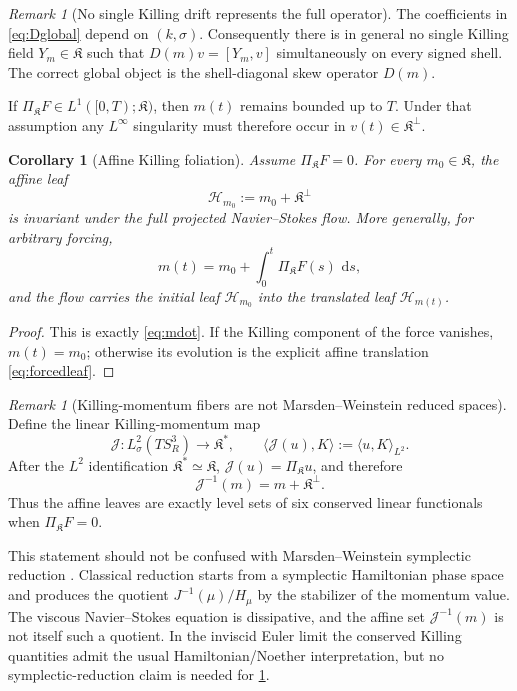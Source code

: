 \documentclass[
 aps,
 prd,
 reprint,
 amsmath,
 amssymb,
 nofootinbib,
 superscriptaddress
]{revtex4-2}
\newtheorem{corollary}[theorem]{Corollary}
\theoremstyle{definition}
\theoremstyle{remark}
\newtheorem{remark}[theorem]{Remark}
\newcommand{\Sthree}{S^3_R}
\newcommand{\cK}{\mathfrak K}
\newcommand{\cH}{\mathcal H}
\newcommand{\dd}{\,\mathrm d}
\begin{document}
\begin{remark}[No single Killing drift represents the full operator]
The coefficients in \eqref{eq:Dglobal} depend on $(k,\sigma)$.
Consequently there is in general no single Killing field $Y_m\in\cK$ such
that $D(m)v=[Y_m,v]$ simultaneously on every signed shell.  The correct
global object is the shell-diagonal skew operator $D(m)$.

If $\Pi_{\cK}F\in L^1([0,T);\cK)$, then $m(t)$ remains bounded up to $T$.
Under that assumption any $L^\infty$ singularity must therefore occur in
$v(t)\in\cK^\perp$.
\end{remark}


\begin{corollary}[Affine Killing foliation]
\label{cor:affinefoliation}
Assume $\Pi_{\cK}F=0$.  For every $m_0\in\cK$, the affine leaf
\begin{equation}
 \boxed{
 \cH_{m_0}:=m_0+\cK^\perp
 }
 \label{eq:affineleaf}
\end{equation}
is invariant under the full projected Navier--Stokes flow.
More generally, for arbitrary forcing,
\begin{equation}
 m(t)=m_0+\int_0^t\Pi_{\cK}F(s)\,\dd s,
 \label{eq:forcedleaf}
\end{equation}
and the flow carries the initial leaf $\cH_{m_0}$ into the translated leaf
$\cH_{m(t)}$.
\end{corollary}

\begin{proof}
This is exactly \eqref{eq:mdot}.  If the Killing component of the force
vanishes, $m(t)=m_0$; otherwise its evolution is the explicit affine
translation \eqref{eq:forcedleaf}.
\end{proof}


\begin{remark}[Killing-momentum fibers are not Marsden--Weinstein reduced spaces]
\label{rem:notMW}
Define the linear Killing-momentum map
\begin{equation}
 \mathcal J:L^2_\sigma(T\Sthree)\longrightarrow\cK^*,
 \qquad
 \langle\mathcal J(u),K\rangle
 :=
 \langle u,K\rangle_{L^2}.
 \label{eq:linearJ}
\end{equation}
After the $L^2$ identification $\cK^*\simeq\cK$,
$\mathcal J(u)=\Pi_{\cK}u$, and therefore
\begin{equation}
 \mathcal J^{-1}(m)=m+\cK^\perp.
 \label{eq:Jfiber}
\end{equation}
Thus the affine leaves are exactly level sets of six conserved linear
functionals when $\Pi_{\cK}F=0$.

This statement should not be confused with Marsden--Weinstein symplectic
reduction \cite{MarsdenWeinstein1974}.  Classical reduction starts from a
symplectic Hamiltonian phase space and produces the quotient
$J^{-1}(\mu)/H_\mu$ by the stabilizer of the momentum value.  The viscous
Navier--Stokes equation is dissipative, and the affine set
$\mathcal J^{-1}(m)$ is not itself such a quotient.  In the inviscid Euler
limit the conserved Killing quantities admit the usual Hamiltonian/Noether
interpretation, but no symplectic-reduction claim is needed for
\cref{cor:affinefoliation}.
\end{remark}
\end{document}

